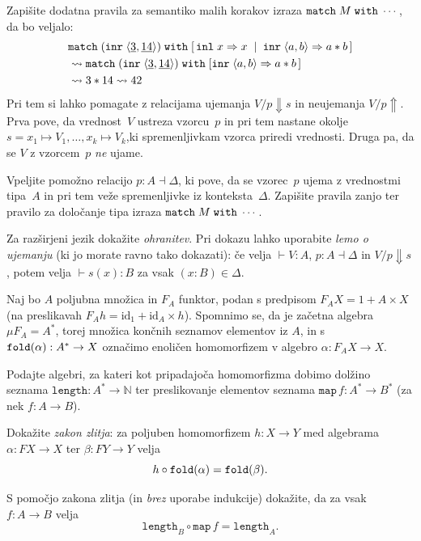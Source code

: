 \documentclass[arhiv]{../izpit}
\begin{document}
\podnaloga
Zapišite dodatna pravila za semantiko malih korakov izraza
$\mathtt{match}\;M\;\mathtt{with}\;\cdots$, da bo veljalo:
\begin{align*}
  &\mathtt{match}\;(\mathtt{inr}\; \langle \underline{3}, \underline{14}\rangle)\;\mathtt{with}\;[\,\mathtt{inl}\; x \Rightarrow x \;\mid\; \mathtt{inr}\; \langle a, b\rangle \Rightarrow a * b\,] \\
  &\leadsto
  \mathtt{match}\;(\mathtt{inr}\; \langle \underline{3}, \underline{14}\rangle)\;\mathtt{with}\;[\mathtt{inr}\; \langle a, b\rangle \Rightarrow a * b\,] \\
  &\leadsto
  3 * 14 \leadsto 42
\end{align*}
Pri tem si lahko pomagate z relacijama ujemanja $V / p \Downarrow s$ in neujemanja $V / p \Uparrow$. Prva pove, da vrednost~$V$ ustreza vzorcu~$p$ in pri tem nastane okolje $s = x_1 \mapsto V_1, \dots, x_k \mapsto V_k$,ki spremenljivkam vzorca priredi vrednosti. Druga pa, da se $V$ z vzorcem~$p$ \emph{ne} ujame. 

\podnaloga
Vpeljite pomožno relacijo $p : A \dashv \Delta$, ki pove, da se vzorec~$p$ ujema z vrednostmi tipa~$A$ in pri tem veže spremenljivke iz konteksta~$\Delta$. Zapišite pravila zanjo ter pravilo za določanje tipa izraza $\mathtt{match}\;M\;\mathtt{with}\;\cdots$.

\podnaloga
Za razširjeni jezik dokažite \emph{ohranitev}. Pri dokazu lahko uporabite \emph{lemo o
ujemanju} (ki jo morate ravno tako dokazati): če velja $\vdash V : A$,
$p : A \dashv \Delta$ in $V / p \Downarrow s$, potem velja $\vdash s(x)
: B$ za vsak $(x : B) \in \Delta$.

\nadaljevanje


\naloga[\tocke{20}]
\newcommand{\listty}[1]{#1^*}

Naj bo $A$ poljubna množica in $F_A$ funktor, podan s predpisom $F_A X = 1 + A \times X$ (na preslikavah $F_A h = \mathrm{id}_1 + \mathrm{id}_A \times h$). Spomnimo se, da je začetna algebra $\mu F_A = \listty A$, torej množica končnih seznamov elementov iz $A$, in s $\fold{\alpha} : \listty A \to X$ označimo enoličen homomorfizem v algebro $\alpha : F_A X \to X$.

\podnaloga
Podajte algebri, za kateri kot pripadajoča homomorfizma dobimo dolžino seznama $\mathtt{length} : \listty A \to \mathbb{N}$ ter preslikovanje elementov seznama $\mathtt{map}\,f : \listty A \to \listty B$ (za nek $f : A \to B$).

\podnaloga
Dokažite \emph{zakon zlitja}: za poljuben homomorfizem $h : X \to Y$ med algebrama $\alpha : F X \to X$ ter {$\beta : F Y \to Y$} velja
\[
  h \circ \mathtt{fold}(\alpha) = \mathtt{fold}(\beta).
\]

\podnaloga
S pomočjo zakona zlitja (in \emph{brez} uporabe indukcije) dokažite, da za vsak $f : A \to B$ velja
\[
  \mathtt{length}_B \circ \mathtt{map}\,f = \mathtt{length}_A.
\]

\nadaljevanje
\end{document}
